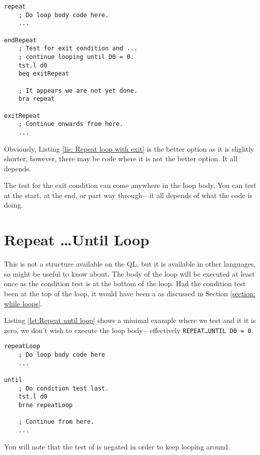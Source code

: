 \begin{lstlisting}[caption={Alternative REPEAT \ldots EXIT \ldots END REPEAT},label={lis: Repeat loop with alternative exit}]
repeat
    ; Do loop body code here.
    ...

endRepeat
    ; Test for exit condition and ...
    ; continue looping until D0 = 0.
    tst.l d0
    beq exitRepeat

    ; It appears we are not yet done.
    bra repeat

exitRepeat
    ; Continue onwards from here.
    ...
\end{lstlisting}

Obviously, Listing \ref{lis: Repeat loop with exit} is the better option as it is slightly shorter, however, there may be code where it is not the better option. It all depends.

The test for the exit condition can come anywhere in the loop body. You can test at the start, at the end, or part way through---it all depends of what the code is doing.

\section{Repeat \ldots\protect Until Loop}\label{section: repeat until loops}

This is not a structure available on the QL, but it is available in other languages, so might be useful to know about. The body of the loop will be executed at least once as the condition test is at the bottom of the loop. Had the condition test been at the top of the loop, it would have been a  as discussed in Section \ref{section: while loops}.

Listing \ref{lst:Repeat until loop} shows a minimal example where we test  and it it is zero, we don't wish to execute the loop body---effectively \texttt{REPEAT\ldots{}UNTIL D0 = 0}.

\begin{lstlisting}[caption={REPEAT UNTIL \ldots},label={lst:Repeat until loop}]
repeatLoop
    ; Do loop body code here
    ...
    
until
    ; Do condition test last.
    tst.l d0
    brne repeatLoop
    
    ; Continue from here.
    ...
\end{lstlisting}

You will note that the test of  is negated in order to keep looping around. 


